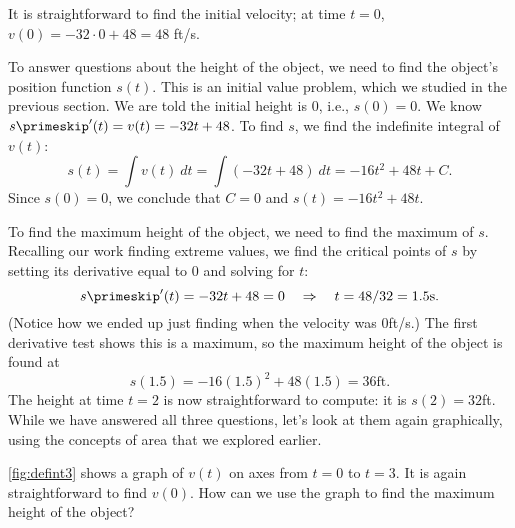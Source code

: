 {It is straightforward to find the initial velocity; at time $t=0$, $v(0) =-32\cdot 0+48 = 48 $ ft/s.

To answer questions about the height of the object, we need to find the object's position function $s(t)$. This is an initial value problem, which we studied in the previous section. We are told the initial height is 0, i.e., $s(0) = 0$. We know $s\primeskip'(t) = v(t) = -32t+48$. To find $s$, we find the indefinite integral of $v(t)$:
\[s(t)=\int v(t)\ dt = \int (-32t+48)\ dt = -16t^2+48t+C.\]
Since $s(0) = 0$, we conclude that $C=0$ and $s(t) = -16t^2+48t$.

To find the maximum height of the object, we need to find the maximum of $s$. Recalling our work finding extreme values, we find the critical points of $s$ by setting its derivative equal to 0 and solving for $t$:
\[s\primeskip'(t) = -32t+48 = 0 \quad \Rightarrow \quad t=48/32 = 1.5\text{s}.\]
(Notice how we ended up just finding when the velocity was 0ft/s.) The first derivative test shows this is a maximum, so the maximum height of the object is found at
\[s(1.5) = -16(1.5)^2+48(1.5)=36\text{ft}.\]
The height at time $t=2$ is now straightforward to compute: it is $s(2) = 32$ft.\\

While we have answered all three questions, let's look at them again graphically, using the concepts of area that we explored earlier.


\autoref{fig:defint3} shows a graph of $v(t)$ on axes from $t=0$ to $t=3$. It is again straightforward to find $v(0)$. How can we use the graph to find the maximum height of the object?


}
